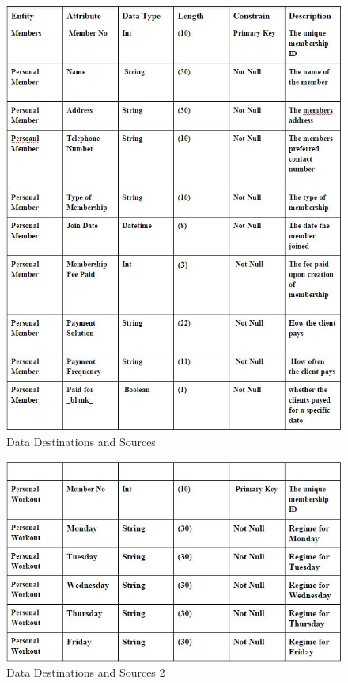 \begin{figure}[H]
    \includegraphics[width=\textwidth]{Sources.jpg}
    \caption{Data Destinations and Sources} \label{fig: Data Destinations and Sources }
\end{figure}

\begin{figure}[H]
    \includegraphics[width=\textwidth]{Sources2.jpg}
    \caption{Data Destinations and Sources 2} \label{fig: Data Destinations and Sources 2 }
\end{figure}

